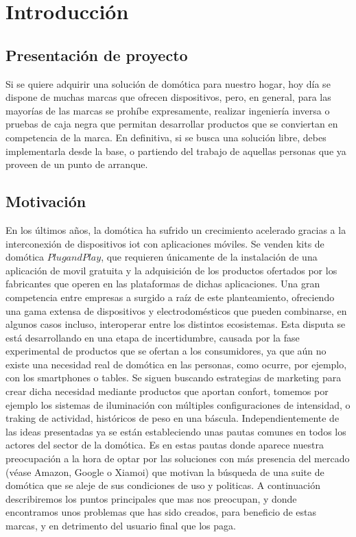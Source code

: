 \cleardoublepage

\chapter{Introducción}

\section{Presentación de proyecto}
\label{ch:Capitulo1}

Si se quiere adquirir una solución de domótica para nuestro hogar, hoy día se dispone de muchas marcas que ofrecen dispositivos, pero, en general, para las mayorías de las marcas se prohíbe expresamente, realizar ingeniería inversa o pruebas de caja negra que permitan desarrollar productos que se conviertan en competencia de la marca. En definitiva, si se busca una solución libre, debes implementarla desde la base, o partiendo del trabajo de aquellas personas que ya proveen de un punto de arranque.

\section{Motivación}
\label{ch:Capitulo1.1}

En los últimos años, la domótica ha sufrido un crecimiento acelerado gracias a la interconexión de dispositivos \gls{iot} con aplicaciones móviles. Se venden kits de domótica $Plug and Play$, que requieren únicamente de la instalación de una aplicación de movil gratuita y la adquisición de los productos ofertados por los fabricantes que operen en las plataformas de dichas aplicaciones. Una gran competencia entre empresas a surgido a raíz de este planteamiento, ofreciendo una gama extensa de dispositivos y electrodomésticos que pueden combinarse, en algunos casos incluso, interoperar entre los distintos ecosistemas. Esta disputa se está desarrollando en una etapa de incertidumbre, causada por la fase experimental de productos que se ofertan a los consumidores, ya que aún no existe una necesidad real de domótica en las personas, como ocurre, por ejemplo, con los smartphones o tables. Se siguen buscando estrategias de marketing para crear dicha necesidad mediante productos que aportan confort, tomemos por ejemplo los sistemas de iluminación con múltiples configuraciones de intensidad, o traking de actividad, históricos de peso en una báscula. Independientemente de las ideas presentadas ya se están estableciendo unas pautas comunes en todos los actores del sector de la domótica. Es en estas pautas donde aparece nuestra preocupación a la hora de optar por las soluciones con más presencia del mercado (véase Amazon, Google o Xiamoi) que motivan la búsqueda de una suite de domótica que se aleje de sus condiciones de uso y politicas. A continuación describiremos los puntos principales que mas nos preocupan, y donde encontramos unos problemas que has sido creados, para beneficio de estas marcas, y en detrimento del usuario final que los paga.

